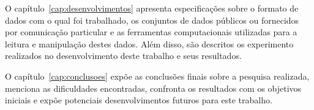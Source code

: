 O capítulo~\ref{cap:desenvolvimentos} apresenta especificações sobre o formato de dados com o qual foi trabalhado, os conjuntos de dados públicos ou fornecidos por comunicação particular e as ferramentas computacionais utilizadas para a leitura e manipulação destes dados. Além disso, são descritos os experimento realizados no desenvolvimento deste trabalho e seus resultados.

O capítulo~\ref{cap:conclusoes} expõe as conclusões finais sobre a pesquisa realizada, menciona as dificuldades encontradas, confronta os resultados com os objetivos iniciais e expõe potenciais desenvolvimentos futuros para este trabalho.


